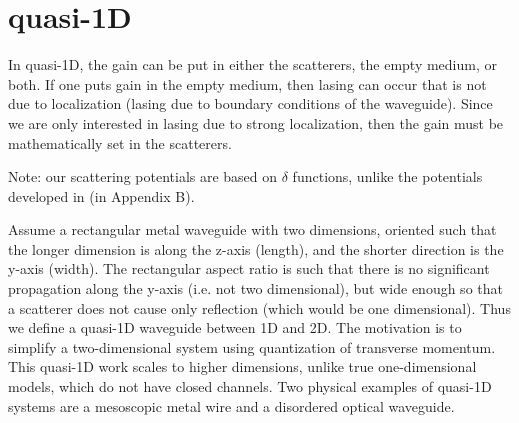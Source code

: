 \section{quasi-1D}

In quasi-1D, the gain can be put in either the scatterers, the empty medium, or both. If one puts gain in the empty medium, then lasing can occur that is not due to localization (lasing due to boundary conditions of the waveguide). Since we are only interested in lasing due to strong localization, then the gain must be mathematically set in the scatterers. 


Note: our scattering potentials are based on $\delta$ functions, unlike the potentials developed in \cite{2007_Froufe-Perez_PRE} (in Appendix B).


Assume a rectangular metal waveguide with two dimensions, oriented such that the longer dimension is along the z-axis (length), and the shorter direction is the y-axis (width). The rectangular aspect ratio is such that there is no significant propagation along the y-axis (i.e. not two dimensional), but wide enough so that a scatterer does not cause only reflection (which would be one dimensional). Thus we define a quasi-1D waveguide between 1D and 2D. The motivation is to simplify a two-dimensional system using quantization of transverse momentum. This quasi-1D work scales to higher dimensions, unlike true one-dimensional models, which do not have closed channels. Two physical examples of quasi-1D systems are a mesoscopic metal wire and a disordered optical waveguide.

